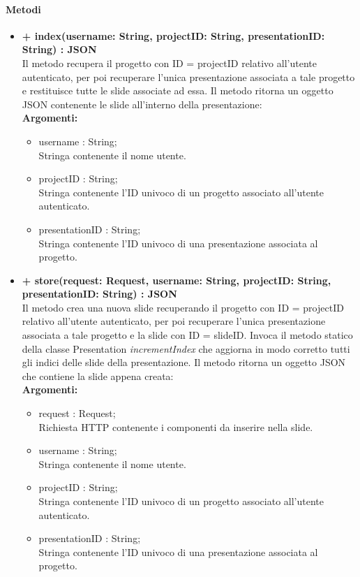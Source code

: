 	\paragraph{Metodi}
		\begin{itemize}
			\item \textbf{+ index(username: String, projectID: String, presentationID: String) : JSON}\\
				Il metodo recupera il progetto con ID = projectID relativo all'utente autenticato, per poi recuperare l'unica presentazione associata a tale progetto e restituisce tutte le slide associate ad essa. Il metodo ritorna un oggetto JSON contenente le slide all'interno della presentazione:\\
				\textbf{Argomenti:}
				\begin{itemize}
					\item username : String; \\
					Stringa contenente il nome utente.
					\item projectID : String; \\
					Stringa contenente l'ID univoco di un progetto associato all'utente autenticato.
					\item presentationID : String; \\
					Stringa contenente l'ID univoco di una presentazione associata al progetto.
				\end{itemize}
				
			\item \textbf{+ store(request: Request, username: String, projectID: String, presentationID: String) : JSON}\\
				Il metodo crea una nuova slide recuperando il progetto con ID = projectID relativo all'utente autenticato, per poi recuperare l'unica presentazione associata a tale progetto e la slide con ID = slideID. Invoca il metodo statico della classe Presentation \textit{incrementIndex} che aggiorna in modo corretto tutti gli indici delle slide della presentazione. Il metodo ritorna un oggetto JSON che contiene la slide appena creata:\\
				\textbf{Argomenti:}
				\begin{itemize}
					\item request : Request;\\
					Richiesta HTTP contenente i componenti da inserire nella slide.
					\item username : String; \\
					Stringa contenente il nome utente.
					\item projectID : String; \\
					Stringa contenente l'ID univoco di un progetto associato all'utente autenticato.
					\item presentationID : String; \\
					Stringa contenente l'ID univoco di una presentazione associata al progetto.
				\end{itemize}
			

\end{itemize}
